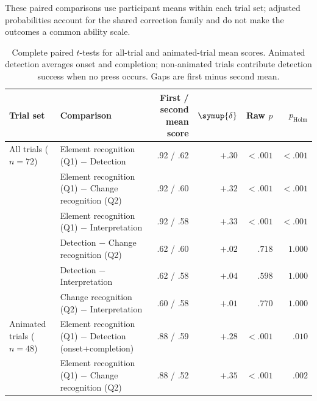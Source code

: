 \documentclass[
english,                 %
bibtex,                  %
includeExtraAbstracts, %
]{kththesis}
\newenvironment{evidenceblock}{\par\addvspace{6pt}\noindent\begin{minipage}{\linewidth}}{\end{minipage}\par\addvspace{6pt}}
\numberwithin{listing}{chapter}
\begin{document}
\begin{evidenceblock}
\normalsize
These paired comparisons use participant means within each trial set; adjusted probabilities account for the shared correction family and do not make the outcomes a common ability scale.

\begin{table}[H]
\centering
\caption[Paired outcome comparisons]{Complete paired $t$-tests for all-trial and animated-trial mean scores. Animated detection averages onset and completion; non-animated trials contribute detection success when no press occurs. Gaps are first minus second mean.}
\label{tab:cross-rq-paired-t-full}
\scriptsize
\setlength{\tabcolsep}{3pt}
\renewcommand{\arraystretch}{1.1}
\begin{tabularx}{\textwidth}{@{}l >{\raggedright\arraybackslash}X r r r r@{}}
\toprule
Trial set & Comparison & \shortstack{First / second\\mean score} & \multicolumn{1}{c}{$\symup{\delta}$} & Raw $p$ & $p_{\mathrm{Holm}}$ \\
\midrule
\shortstack[l]{All trials\\($n = 72$)} & Element recognition (Q1) $-$ Detection & .92 / .62 & $+.30$ & $< .001$ & $< .001$ \\

 & Element recognition (Q1) $-$ Change recognition (Q2) & .92 / .60 & $+.32$ & $< .001$ & $< .001$ \\

 & Element recognition (Q1) $-$ Interpretation & .92 / .58 & $+.33$ & $< .001$ & $< .001$ \\

 & Detection $-$ Change recognition (Q2) & .62 / .60 & $+.02$ & $.718$ & $1.000$ \\

 & Detection $-$ Interpretation & .62 / .58 & $+.04$ & $.598$ & $1.000$ \\

 & Change recognition (Q2) $-$ Interpretation & .60 / .58 & $+.01$ & $.770$ & $1.000$ \\

\midrule
\shortstack[l]{Animated trials\\($n = 48$)} & Element recognition (Q1) $-$ Detection (onset+completion) & .88 / .59 & $+.28$ & $< .001$ & $.010$ \\

 & Element recognition (Q1) $-$ Change recognition (Q2) & .88 / .52 & $+.35$ & $< .001$ & $.002$ \\


\end{tabularx}
\end{table}
\end{evidenceblock}
\end{document}
